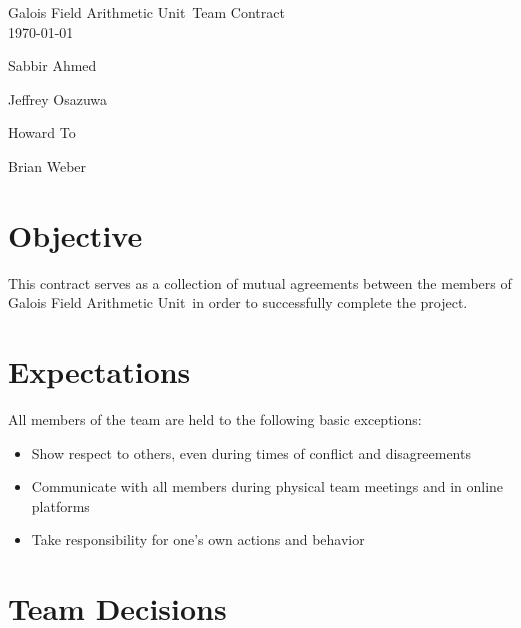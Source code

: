 \documentclass[paper=usletter, fontsize=12pt]{article}
\newcommand{\team}{Galois Field Arithmetic Unit}
\newcommand{\Sabbir}{Sabbir Ahmed}
\newcommand{\Jeffrey}{Jeffrey Osazuwa}
\newcommand{\Howard}{Howard To}
\newcommand{\Brian}{Brian Weber}
\begin{document}
    \begin{titlepage}

        \vspace*{\fill} %
        \begin{center}

            {\LARGE \team~Team Contract}\\ [1.5cm]

            \today
            
            \vspace*{\fill}

            \Sabbir

            \Jeffrey

            \Howard

            \Brian

        \end{center}
        \vspace*{\fill} %

    \end{titlepage}

    \section{Objective}

        This contract serves as a collection of mutual agreements between the members of \team \ in order to successfully complete the project.

    \section{Expectations}

        All members of the team are held to the following basic exceptions:

        \begin{itemize}

            \item Show respect to others, even during times of conflict and disagreements
            \item Communicate with all members during physical team meetings and in online platforms
            \item Take responsibility for one’s own actions and behavior

        \end{itemize}

    \section{Team Decisions}
\end{document}
